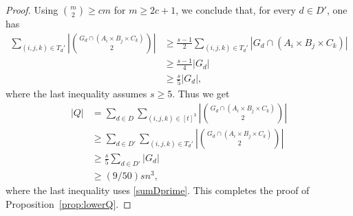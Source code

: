 \documentclass[letterpaper, reqno,11pt]{article}
\theoremstyle{definition}
\theoremstyle{remark}
\begin{document}
\begin{proof}
Using $\binom{m}{2}\ge cm$ for $m\ge 2c+1$, we conclude that, for every $d\in D'$, one has
\begin{align*}
\sum_{(i,j,k)\in T_d'}\left|\binom{G_d\cap (A_i\times B_j\times C_k)}{2}\right|
&\ge 
\frac{s-1}{2}\sum_{(i,j,k)\in T_d'}|G_d\cap (A_i\times B_j\times C_k)|\\
&\ge 
\frac{s-1}{4}|G_d|\\
&\ge
\frac{s}{5}|G_d|
,
\end{align*}
where the last inequality assumes $s\ge 5$. 
Thus we get
\begin{align*}
|Q|
&=\sum_{d\in D}\sum_{(i,j,k)\in [t]^3}\left|\binom{G_d \cap (A_i\times B_j\times C_k)}{2}\right|\\
&\ge \sum_{d\in D'}\sum_{(i,j,k)\in T_d'}\left|\binom{G_d \cap (A_i\times B_j\times C_k)}{2}\right|\\
&\ge \frac{s}{5} \sum_{d\in D'}|G_d|\\
&\ge (9/50)sn^3,
\end{align*}
where the last inequality uses \eqref{sumDprime}. 
This completes the proof of Proposition~\ref{prop:lowerQ}.
\end{proof}
\end{document}

